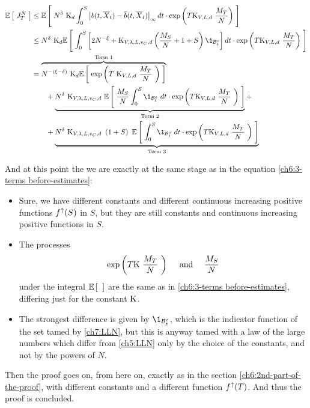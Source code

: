 \begin{equation}
	\begin{aligned}
	\E{\auxProc_T^N}
	&\leq 
	\E{
		N^{\cutparameter}\
		\const_d
		\int_0^S
		\norm{\drift(t, \mfsol_t) - \mfdrift(t, \mfsol_t)}_\infty 
		dt
		\cdot
		\exp \left(
		T
		\const_{\attraction,\NumCampRelease,d}\
		\frac{\hmactive_T}{N}
		\right)
	}
	\\
	&\leq
	N^{\cutparameter}\
	\const_d
	\E{
		\int_0^S
			\left[
				2N^{-\xi}
				+
				\const_{\attraction, \lambda,\NumCampRelease,\cdrift,d} 
				\left(
				\frac{\hmactive_S}{N}
				+
				1
				+
				S
				\right)
				\1_{\setB_t^c}
			\right]
		dt
		\cdot
		\exp \left(
			T
			\const_{\attraction,\NumCampRelease,d}\
			\frac{\hmactive_T}{N}
		\right)
	}
	\\
	&= 
	\overbrace{
		N^{-(\xi -\cutparameter)}\
		\const_d
		\E{
			\exp \left(
			T\
			\const_{\attraction,\NumCampRelease,d}\
			\frac{\hmactive_T}{N}\
			\right)
		}
	}^{\text{Term }1}
	\\
	&\qquad
	+ 
	\underbrace{
		N^{\cutparameter}\
		\const_{\attraction, \lambda,\NumCampRelease,\cdrift,d}\
		\E{
			\frac{\hmactive_S}{N} 
			\int_0^S
			\1_{\setB_t^c}\
			dt
			\cdot
			\exp \left(
			T
			\const_{\attraction,\NumCampRelease,d}\
			\frac{\hmactive_T}{N}\
			\right)
		}
	}_{\text{Term }2}	
	+
	\\
	&\qquad
	+ 
	\underbrace{
		N^{\cutparameter}\
		\const_{\attraction, \lambda,\NumCampRelease,\cdrift,d}\
		\left(
		1+S
		\right)\
		\E{
			\int_0^S
			\1_{\setB_t^c}\
			dt
			\cdot
			\exp \left(
			T
			\const_{\attraction,\NumCampRelease,d}\
			\frac{\hmactive_T}{N}\
			\right)
		}
	}_{\text{Term }3}
	\end{aligned}
\end{equation}

And at this point the we are exactly at the same stage as in the equation \ref{ch6:3-terms before-estimates}:
\begin{itemize}
	\item Sure, we have different constants and different continuous increasing positive functions $f^\uparrow(S)$ in $S$, but they are still constants and continuous increasing positive functions in $S$.
	\item The processes 
	\begin{equation*}
			\exp \left(
			T
			\text{K}\
			\frac{M_T}{N}\
			\right)
		\quad
			\text{ and }
		\quad
			\frac{M_S}{N}
	\end{equation*}
	under the integral $\mathbb{E} \left[ \;  \; \right]$ are the same as in \ref{ch6:3-terms before-estimates}, differing just for the constant $\text{K}$.
	\item The strongest difference is given by $\1_{\setB_t^c}$, which is the indicator function of the set tamed by \ref{ch7:LLN}, but this is anyway tamed with a law of the large numbers which differ from \ref{ch5:LLN} only by the choice of the constants, and not by the powers of $N$.
\end{itemize}

Then the proof goes on, from here on, exactly as in the section \ref{ch6:2nd-part-of-the-proof}, with different constants and a different function $f^\uparrow(T)$.
And thus the proof is concluded.
